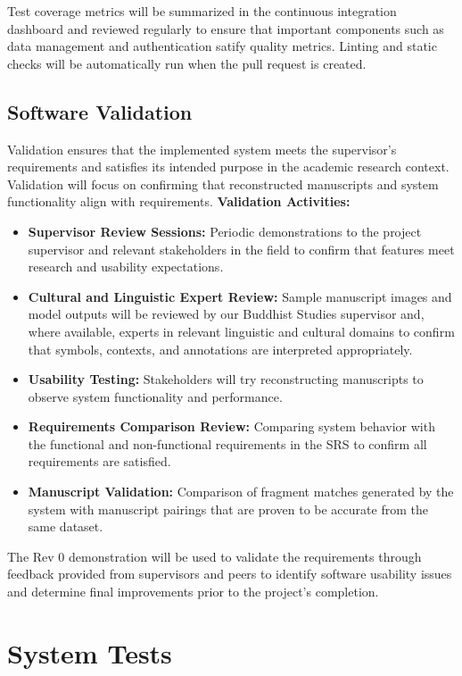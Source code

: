 \documentclass[12pt, titlepage]{article}
\begin{document}
Test coverage metrics will be summarized in the continuous integration dashboard and reviewed regularly to ensure that important components such as data management and authentication satify quality metrics. Linting and static checks will be automatically run when the pull request is created.


\subsection{Software Validation}

Validation ensures that the implemented system meets the supervisor's requirements and satisfies its intended purpose in the academic research context. Validation will focus on confirming that reconstructed manuscripts and system functionality align with requirements.
\newline
\newline
\textbf{Validation Activities:}
\begin{itemize}
  \item \textbf{Supervisor Review Sessions:} Periodic demonstrations to the project supervisor and relevant stakeholders in the field to confirm that features meet research and usability expectations.
  \item \textbf{Cultural and Linguistic Expert Review:} Sample manuscript images and model outputs will be reviewed by our Buddhist Studies supervisor and, where available, experts in relevant linguistic and cultural domains to confirm that symbols, contexts, and annotations are interpreted appropriately.
  \item \textbf{Usability Testing:} Stakeholders will try reconstructing manuscripts to observe system functionality and performance.
  \item \textbf{Requirements Comparison Review:} Comparing system behavior with the functional and non-functional requirements in the SRS to confirm all requirements are satisfied.
  \item \textbf{Manuscript Validation:} Comparison of fragment matches generated by the system with manuscript pairings that are proven to be accurate from the same dataset.
\end{itemize}

The Rev 0 demonstration will be used to validate the requirements through feedback provided from supervisors and peers to identify software usability issues and determine final improvements prior to the project's completion.

\section{System Tests}
\end{document}
